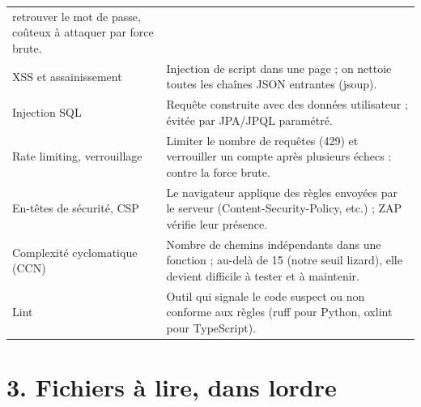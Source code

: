 \documentclass[
  11pt,
]{article}
\begin{document}
\begin{longtable}[]{@{}
  >{\raggedright\arraybackslash}p{}
  >{\raggedright\arraybackslash}p{}@{}}
retrouver le mot de passe, coûteux à attaquer par force brute. \\
XSS et assainissement & Injection de script dans une page ; on nettoie
toutes les chaînes JSON entrantes (jsoup). \\
Injection SQL & Requête construite avec des données utilisateur ; évitée
par JPA/JPQL paramétré. \\
Rate limiting, verrouillage & Limiter le nombre de requêtes (429) et
verrouiller un compte après plusieurs échecs : contre la force brute. \\
En-têtes de sécurité, CSP & Le navigateur applique des règles envoyées
par le serveur (Content-Security-Policy, etc.) ; ZAP vérifie leur
présence. \\
Complexité cyclomatique (CCN) & Nombre de chemins indépendants dans une
fonction ; au-delà de 15 (notre seuil lizard), elle devient difficile à
tester et à maintenir. \\
Lint & Outil qui signale le code suspect ou non conforme aux règles
(ruff pour Python, oxlint pour TypeScript). \\
\end{longtable}

\section{3. Fichiers à lire, dans
l\textquotesingle ordre}\label{3-fichiers-uxe0-lire-dans-lordre}
\end{document}
